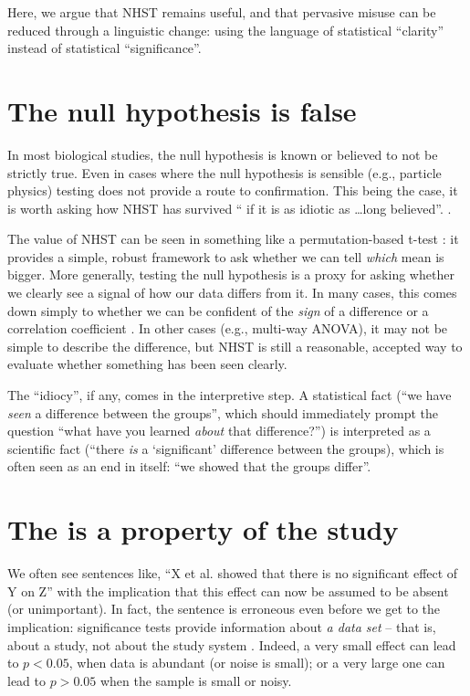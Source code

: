 Here, we argue that NHST remains useful, and that pervasive misuse can be reduced through a linguistic change: using the language of statistical ``clarity'' instead of statistical ``significance''.

\section*{The null hypothesis is false}

In most biological studies, the null hypothesis is known or believed to not be strictly true.
Even in cases where the null hypothesis is sensible (e.g., particle physics) \pval testing does not provide a route to confirmation.
This being the case, it is worth asking how NHST has survived `` if it is as idiotic as \ldots long believed''. 
 \citet{Kramer2011}.

The value of NHST can be seen in something like a permutation-based t-test \cite[Chapter 1]{GoodBook}: it provides a simple, robust framework to ask whether we can tell \emph{which} mean is bigger. 
More generally, testing the null hypothesis is a proxy for asking whether we clearly see a signal of how our data differs from it.
In many cases, this comes down simply to whether we can be confident of the \emph{sign} of a difference or a correlation coefficient \citep{robinson2001past}. 
In other cases (e.g., multi-way ANOVA), it may not be simple to describe the difference, but NHST is still a reasonable, accepted way to evaluate whether something has been seen clearly.

The ``idiocy'', if any, comes in the interpretive step. A statistical fact (``we have \emph{seen} a difference between the groups'', which should immediately prompt the question ``what have you learned \emph{about} that difference?'') is interpreted as a scientific fact (``there \emph{is} a `significant' difference between the groups), which is often seen as an end in itself: ``we showed that the groups differ''.

\section*{The \pval is a property of the study}

We often see sentences like, ``X et al. showed that there is no significant effect of Y on Z'' with the implication that this effect can now be assumed to be absent (or unimportant). In fact, the sentence is erroneous even before we get to the implication: significance tests provide information about \emph{a data set} -- that is, about a study, not about the study system \citep{HoenigandHeisey2001}.
Indeed, a very small effect can lead to $p < 0.05$, when data is abundant (or noise is small); or a very large one can lead to $p > 0.05$ when the sample is small or noisy. 

